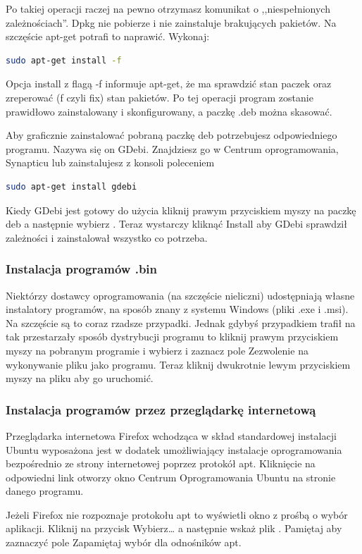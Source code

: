 Po takiej operacji raczej na pewno otrzymasz komunikat o ,,niespełnionych zależnościach''. Dpkg nie pobierze i nie zainstaluje brakujących pakietów. Na szczęście apt-get potrafi to naprawić. Wykonaj:
\begin{lstlisting}[language=bash]
sudo apt-get install -f
\end{lstlisting}
Opcja \textcolor{ubuntu_orange}{install} z flagą \textcolor{ubuntu_orange}{-f} informuje apt-get, że ma sprawdzić stan paczek oraz zreperować (f czyli fix) stan pakietów. Po tej operacji program zostanie prawidłowo zainstalowany i skonfigurowany, a paczkę .deb można skasować.

Aby graficznie zainstalować pobraną paczkę deb potrzebujesz odpowiedniego programu. Nazywa się on \textcolor{ubuntu_orange}{GDebi}. Znajdziesz go w Centrum oprogramowania, Synapticu lub zainstalujesz z konsoli poleceniem
\begin{lstlisting}[language=bash]
sudo apt-get install gdebi
\end{lstlisting}

Kiedy GDebi jest gotowy do użycia kliknij prawym przyciskiem myszy na paczkę deb a następnie wybierz . Teraz wystarczy kliknąć \textcolor{ubuntu_orange}{Install} aby GDebi sprawdził zależności i zainstalował wszystko co potrzeba.

\subsubsection{Instalacja programów .bin}
Niektórzy dostawcy oprogramowania (na szczęście nieliczni) udostępniają własne instalatory programów, na sposób znany z systemu Windows (pliki .exe i .msi). Na szczęście są to coraz rzadsze przypadki. Jednak gdybyś przypadkiem trafił na tak przestarzały sposób dystrybucji programu to kliknij prawym przyciskiem myszy na pobranym programie i wybierz  i zaznacz pole \textcolor{ubuntu_orange}{Zezwolenie na wykonywanie pliku jako programu}. Teraz kliknij dwukrotnie lewym przyciskiem myszy na pliku aby go uruchomić.

\subsubsection{Instalacja programów przez przeglądarkę internetową}
Przeglądarka internetowa Firefox wchodząca w skład standardowej instalacji Ubuntu wyposażona jest w dodatek umożliwiający instalacje oprogramowania bezpośrednio ze strony internetowej poprzez protokół apt. Kliknięcie na odpowiedni link otworzy okno \textcolor{ubuntu_orange}{Centrum Oprogramowania Ubuntu} na stronie danego programu.

Jeżeli Firefox nie rozpoznaje protokołu apt to wyświetli okno z prośbą o wybór aplikacji. Kliknij na przycisk \textcolor{ubuntu_orange}{Wybierz\ldots} a następnie wskaż plik . Pamiętaj aby zaznaczyć pole \textcolor{ubuntu_orange}{Zapamiętaj wybór dla odnośników apt}.
